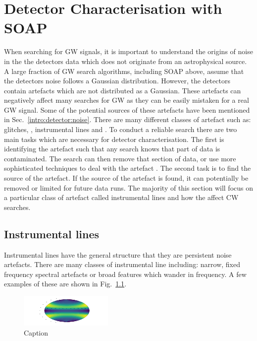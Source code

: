 \chapter{\label{detchar}Detector Characterisation with SOAP}

When searching for \ac{GW} signals, it is important to understand the origins of noise in the the detectors data which does not originate from an astrophysical source.
A large fraction of \ac{GW} search algorithms, including SOAP above, assume that the detectors noise follows a Gaussian distribution.
However, the detectors contain artefacts which are not distributed as a Gaussian. 
These artefacts can negatively affect many searches for \ac{GW} as they can be easily mistaken for a real \ac{GW} signal.
Some of the potential sources of these artefacts have been mentioned in Sec.~\ref{intro:detector:noise}. 
There are many different classes of artefact such as: glitches, , instrumental lines and .
To conduct a reliable search there are two main tasks which are necessary for detector characterisation.
The first is identifying the artefact such that any search knows that part of data is contaminated.
The search can then remove that section of data, or use more sophisticated techniques to deal with the artefact \citep{}.
The second task is to find the source of the artefact. 
If the source of the artefact is found, it can potentially be removed or limited for future data runs.
The majority of this section will focus on a particular class of artefact called instrumental lines and how the affect \ac{CW} searches.





\section{Instrumental lines}

Instrumental lines have the general structure that they are persistent noise artefacts.
There are many classes of instrumental line including: narrow, fixed frequency spectral artefacts or broad features which wander in frequency.
A few examples of these are shown in Fig.~\ref{}. 

\begin{figure}
    \centering
    \includegraphics[width=\textwidth]{testimg.png}
    \caption{Caption}
    \label{fig:my_label}
\end{figure}

